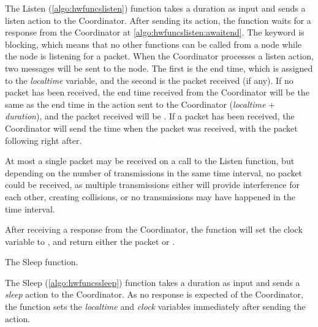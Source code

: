 The Listen (\autoref{algo:hwfuncslisten}) function takes a duration as input and sends a listen action to the
Coordinator. After sending its action, the function waits for a response from the Coordinator at
\autoref{algo:hwfuncslisten:awaitend}. The \KwAwait keyword is blocking, which means that no other functions
can be called from a node while the node is listening for a packet. When the Coordinator processes a listen
action, two messages will be sent to the node. The first is the end time, which is assigned to the
\textit{localtime} variable, and the second is the packet received (if any). If no packet has been received,
the end time received from the Coordinator will be the same as the end time in the action sent to the
Coordinator (\textit{localtime} $+$ \textit{duration}), and the packet received will be \KwNull. If a packet
has been received, the Coordinator will send the time when the packet was received, with the packet following
right after.

At most a single packet may be received on a call to the Listen function, but depending on the number
of transmissions in the same time interval, no packet could be received, as multiple transmissions either will
provide interference for each other, creating collisions, or no transmissions may have happened in the time
interval.

After receiving a response from the Coordinator, the function will set the clock variable to \KwNow, and
return either the packet or \KwNull. \medbreak

\begin{algorithm}[ht]
    \DontPrintSemicolon
    
    
    \caption{The Sleep function.}
    \label{algo:hwfuncssleep}
\end{algorithm}

The Sleep (\autoref{algo:hwfuncssleep}) function takes a duration as input and sends a \textit{sleep} action to the
Coordinator. As no response is expected of the Coordinator, the function sets the \textit{localtime} and
\textit{clock} variables immediately after sending the action. \medbreak

